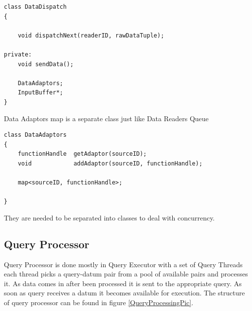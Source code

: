 \documentclass[14pt]{article}
\begin{document}
\begin{verbatim}
class DataDispatch
{
	
	void dispatchNext(readerID, rawDataTuple);

private:
    void sendData();
	
    DataAdaptors;
    InputBuffer*;
}
\end{verbatim}

\noindent Data Adaptors map is a separate class just like Data Readers Queue

\begin{verbatim}
class DataAdaptors
{
    functionHandle  getAdaptor(sourceID);
    void            addAdaptor(sourceID, functionHandle);

    map<sourceID, functionHandle>;
	
}
\end{verbatim}
\noindent They are needed to be separated into classes to deal with concurrency.

\subsection{Query Processor}

Query Processor is done mostly in Query Executor with a set of Query Threads each thread picks a query-datum pair from a pool of available pairs and processes it. As data comes in after been processed it is sent to the appropriate query. As soon as query receives a datum it becomes available for execution. The structure of query processor can be found in figure \ref{QueryProcessingPic}.
\end{document}
